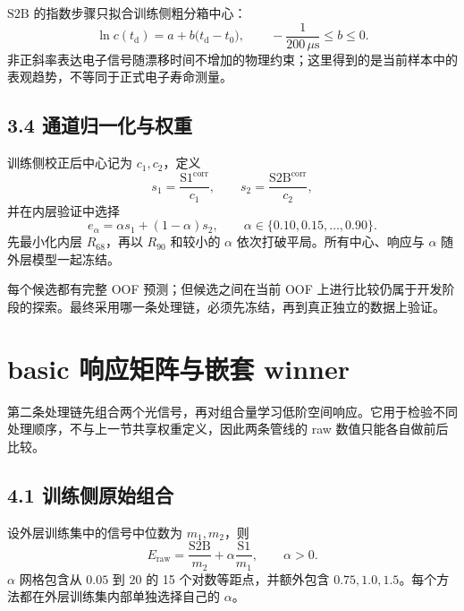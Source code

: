 \documentclass[UTF8,11pt,a4paper,oneside,fontset=none]{ctexart}
\newcommand{\SoneLY}{\mathrm{S1}}
\newcommand{\StwoLY}{\mathrm{S2B}}
\newcommand{\Rsixtyeight}{R_{68}}
\newcommand{\Rninty}{R_{90}}
\begin{document}
$\StwoLY$ 的指数步骤只拟合训练侧粗分箱中心：
\begin{equation}
  \ln c(t_{\mathrm d})
  =a+b\bigl(t_{\mathrm d}-t_0\bigr),
  \qquad
  -\frac{1}{200\,\mu\mathrm{s}}\le b\le0.
\end{equation}
非正斜率表达电子信号随漂移时间不增加的物理约束；这里得到的是当前样本中的表观趋势，不等同于正式电子寿命测量。

\subsection*{3.4 通道归一化与权重}

训练侧校正后中心记为 $c_1,c_2$，定义
\begin{equation}
  s_1=\frac{\SoneLY^{\mathrm{corr}}}{c_1},
  \qquad
  s_2=\frac{\StwoLY^{\mathrm{corr}}}{c_2},
\end{equation}
并在内层验证中选择
\begin{equation}
  e_{\alpha}=\alpha s_1+(1-\alpha)s_2,
  \qquad
  \alpha\in\{0.10,0.15,\ldots,0.90\}.
\end{equation}
先最小化内层 $\Rsixtyeight$，再以 $\Rninty$ 和较小的 $\alpha$ 依次打破平局。所有中心、响应与 $\alpha$ 随外层模型一起冻结。

\begin{boundarybox}[title={A0--A4 的统计身份},fonttitle=\bfseries]
每个候选都有完整 OOF 预测；但候选之间在当前 OOF 上进行比较仍属于开发阶段的探索。最终采用哪一条处理链，必须先冻结，再到真正独立的数据上验证。
\end{boundarybox}

\section{basic 响应矩阵与嵌套 winner}

第二条处理链先组合两个光信号，再对组合量学习低阶空间响应。它用于检验不同处理顺序，不与上一节共享权重定义，因此两条管线的 raw 数值只能各自做前后比较。

\subsection*{4.1 训练侧原始组合}

设外层训练集中的信号中位数为 $m_1,m_2$，则
\begin{equation}
  E_{\mathrm{raw}}
  =\frac{\StwoLY}{m_2}
  +\alpha\frac{\SoneLY}{m_1},
  \qquad \alpha>0.
\end{equation}
$\alpha$ 网格包含从 $0.05$ 到 $20$ 的 15 个对数等距点，并额外包含 $0.75,1.0,1.5$。每个方法都在外层训练集内部单独选择自己的 $\alpha$。
\end{document}
